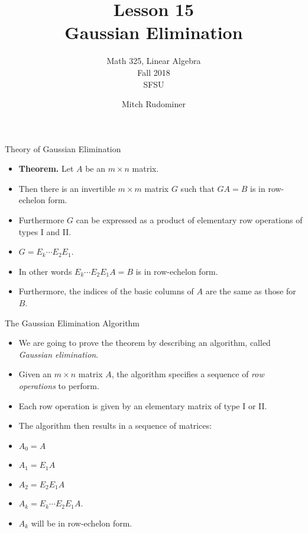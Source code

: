 \documentclass{beamer}
\title{Lesson 15 \\ Gaussian Elimination}
\subtitle{Math 325, Linear Algebra \\ Fall 2018 \\ SFSU}
\author{Mitch Rudominer}
\date{}
\begin{document}
\begin{frame}
  \titlepage
\end{frame}


\begin{frame}{Theory of Gaussian Elimination}

\begin{itemize}
\item \textbf{Theorem.} Let $A$ be an $m\times n$ matrix.
\item Then there is an invertible $m\times m$ matrix $G$ such that
$GA = B$ is in row-echelon form.
\item Furthermore $G$ can be expressed as a product of elementary row operations
of types I and II.
\item $G = E_k \cdots E_2 E_1$.
\item In other words $E_k \cdots E_2 E_1 A = B$ is in row-echelon form.
\item Furthermore, the indices of the basic columns of $A$ are the same as those for $B$.
\end{itemize}
\end{frame}


\begin{frame}{The Gaussian Elimination Algorithm}

\begin{itemize}
\item We are going to prove the theorem by describing an algorithm,
called \emph{Gaussian elimination}.
\item Given an $m\times n$ matrix $A$, the algorithm specifies a
sequence of \emph{row operations} to perform.
\item Each row operation is given by an elementary matrix of type I or II.
\item The algorithm then results in a sequence of matrices:
\item $A_0 = A$
\item $A_1 = E_1 A$
\item $A_2 = E_2 E_1 A$
\item $A_k = E_k \cdots E_2 E_1 A$.
\item $A_k$ will be in row-echelon form.
\end{itemize}
\end{frame}

\end{document}
